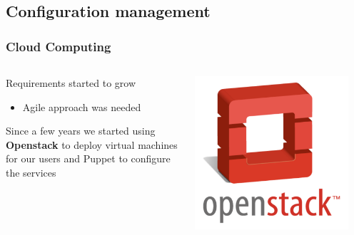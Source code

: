 \documentclass[aspectratio=169]{beamer}
\begin{document}

\subsection{Configuration management}
\begin{frame}
    \frametitle{Cloud Computing}
    \begin{minipage}[t]{0.95\textwidth}
        \begin{columns}
            \begin{column}{0.8\textwidth}
                Requirements started to grow
                \begin{itemize}
                    \item Agile approach was needed
                \end{itemize}
                Since a few years we started using \textbf{Openstack} to
                deploy virtual machines for our users and Puppet to
                configure the services
            \end{column}
            \begin{column}{0.2\textwidth}
                \includegraphics[width=0.9\textwidth]{openstack-logo512.png}
            \end{column}
        \end{columns}
    \end{minipage}
    \vspace{\belowdisplayskip}

\end{frame}
\end{document}
